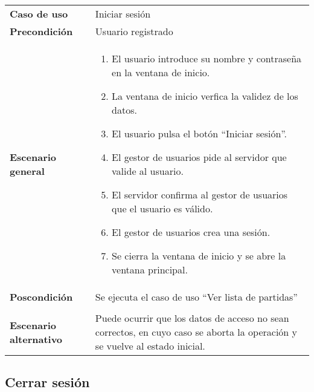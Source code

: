 {\footnotesize
\begin{tabularx}{0.95\textwidth}{p{}|X}

\textbf{Caso de uso} & Iniciar sesión \\

\textbf{Precondición} & Usuario registrado \\

\textbf{Escenario general} & \begin{enumerate}
\item El usuario introduce su nombre y contraseña en la ventana de inicio.
\item La ventana de inicio verfica la validez de los datos.
\item El usuario pulsa el botón ``Iniciar sesión''.
\item El gestor de usuarios pide al servidor que valide al usuario.
\item El servidor confirma al gestor de usuarios que el usuario es válido.
\item El gestor de usuarios crea una sesión.
\item Se cierra la ventana de inicio y se abre la ventana principal.
\end{enumerate} \\

\textbf{Poscondición} & Se ejecuta el caso de uso ``Ver lista de partidas''
\\ \\

\textbf{Escenario alternativo} & Puede ocurrir que los datos de acceso no sean
correctos, en cuyo caso se aborta la operación y se vuelve al estado inicial.

\end{tabularx}
}
\clearpage
\subsection{Cerrar sesión}

